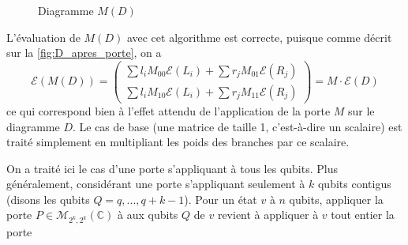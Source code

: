 \begin{figure}[H]
  \centering
  \caption {Diagramme $M(D)$}
  \label{fig:D_apres_porte}
\end{figure}

L'évaluation de $M(D)$ avec cet algorithme est correcte, puisque comme décrit sur la \autoref{fig:D_apres_porte}, on a
$$\mathcal E(M(D)) = \begin{pmatrix}
  \sum l_i M_{00} \mathcal E (L_i) + \sum r_j M_{01} \mathcal E (R_j) \\
  \sum l_i M_{10} \mathcal E (L_i) + \sum r_j M_{11} \mathcal E (R_j)
\end{pmatrix} = M \cdot \mathcal E (D)$$
\noindent ce qui correspond bien à l'effet attendu de l'application de la porte $M$ sur le diagramme $D$. Le cas de base (une matrice de taille 1, c'est-à-dire un scalaire) est traité simplement en multipliant les poids des branches par ce scalaire.

On a traité ici le cas d'une porte s'appliquant à tous les qubits. Plus généralement, considérant une porte s'appliquant seulement à $k$ qubits contigus (disons les qubits $Q ={q, ..., q+k-1}$). Pour un état $v$ à $n$ qubits, appliquer la porte $P \in \mathcal M_{2^k, 2^k}(\mathbb C)$ à aux qubits $Q$ de $v$ revient à appliquer à $v$ tout entier la porte

